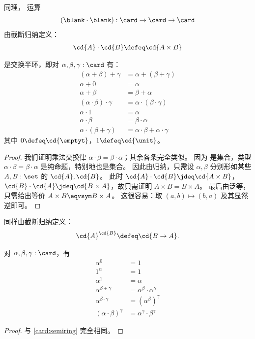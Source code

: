\begin{defn}
  同理，
  运算
  \[ (\blank\cdot\blank) : \card \to \card \to \card \]
  由截断归纳定义：
  \[ \cd{A} \cdot \cd{B} \defeq \cd{A\times B} \]
\end{defn}

\begin{lem}\label{card:semiring}
  \card 是交换半环，即对 $\alpha,\beta,\gamma:\card$ 有：
  \begin{align*}
    (\alpha+\beta)+\gamma &= \alpha+(\beta+\gamma)\\
    \alpha+0 &= \alpha\\
    \alpha + \beta &= \beta + \alpha\\
    (\alpha \cdot \beta) \cdot \gamma &= \alpha \cdot (\beta\cdot\gamma)\\
    \alpha \cdot 1 &= \alpha\\
    \alpha\cdot\beta &= \beta\cdot\alpha\\
    \alpha\cdot(\beta+\gamma) &= \alpha\cdot\beta + \alpha\cdot\gamma
  \end{align*}
  其中 $0 \defeq \cd{\emptyt}$，$1\defeq\cd{\unit}$。
\end{lem}
\begin{proof}
  我们证明乘法交换律 $\alpha\cdot\beta = \beta\cdot\alpha$；其余各条完全类似。
  因为 \card 是集合，类型 $\alpha\cdot\beta = \beta\cdot\alpha$ 是纯命题，特别地也是集合。
  因此由归纳，只需设 $\alpha,\beta$ 分别形如某些 $A,B:\set$ 的 $\cd{A},\cd{B}$。
  此时 $\cd{A}\cdot \cd{B} \jdeq \cd{A\times B}$，$\cd{B}\cdot\cd{A} \jdeq \cd{B\times A}$，故只需证明 $A\times B = B\times A$。
  最后由泛等，只需给出等价 $A\times B \eqvsym B\times A$。
  这很容易：取 $(a,b) \mapsto (b,a)$ 及其显然逆即可。
\end{proof}

\begin{defn}
  同样由截断归纳定义：
  \[ \cd{A}^{\cd{B}} \defeq \cd{B\to A}. \]
\end{defn}

\begin{lem}\label{card:exp}
  对 $\alpha,\beta,\gamma:\card$，有
  \begin{align*}
    \alpha^0 &= 1\\
    1^\alpha &= 1\\
    \alpha^1 &= \alpha\\
    \alpha^{\beta+\gamma} &= \alpha^\beta \cdot \alpha^\gamma\\
    \alpha^{\beta\cdot \gamma} &= (\alpha^{\beta})^\gamma\\
    (\alpha\cdot\beta)^\gamma &= \alpha^\gamma \cdot \beta^\gamma
  \end{align*}
\end{lem}
\begin{proof}
  与 \cref{card:semiring} 完全相同。
\end{proof}

